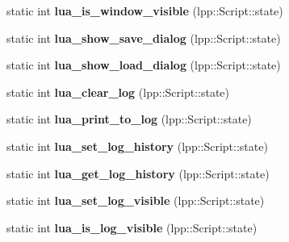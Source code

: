 \begin{DoxyCompactItemize}
\item 
static int {\bfseries lua\+\_\+is\+\_\+window\+\_\+visible} (lpp\+::\+Script\+::state)\hypertarget{class_lua_interface_a4317501b9787dac8b939cb7f7e69f614}{}\label{class_lua_interface_a4317501b9787dac8b939cb7f7e69f614}

\item 
static int {\bfseries lua\+\_\+show\+\_\+save\+\_\+dialog} (lpp\+::\+Script\+::state)\hypertarget{class_lua_interface_ad1b4e058570031254dd4723e580b5000}{}\label{class_lua_interface_ad1b4e058570031254dd4723e580b5000}

\item 
static int {\bfseries lua\+\_\+show\+\_\+load\+\_\+dialog} (lpp\+::\+Script\+::state)\hypertarget{class_lua_interface_a90d8da940b5131634578c415641025eb}{}\label{class_lua_interface_a90d8da940b5131634578c415641025eb}

\item 
static int {\bfseries lua\+\_\+clear\+\_\+log} (lpp\+::\+Script\+::state)\hypertarget{class_lua_interface_add5ca19699ca60b9bac9a83d91a36740}{}\label{class_lua_interface_add5ca19699ca60b9bac9a83d91a36740}

\item 
static int {\bfseries lua\+\_\+print\+\_\+to\+\_\+log} (lpp\+::\+Script\+::state)\hypertarget{class_lua_interface_a0c3a74e86ea961cdd7ddab5b56f562d3}{}\label{class_lua_interface_a0c3a74e86ea961cdd7ddab5b56f562d3}

\item 
static int {\bfseries lua\+\_\+set\+\_\+log\+\_\+history} (lpp\+::\+Script\+::state)\hypertarget{class_lua_interface_afbce58059a82b5a7822da586282d630b}{}\label{class_lua_interface_afbce58059a82b5a7822da586282d630b}

\item 
static int {\bfseries lua\+\_\+get\+\_\+log\+\_\+history} (lpp\+::\+Script\+::state)\hypertarget{class_lua_interface_a6d3e725b2559b70e7ad4a9c21dac0d1b}{}\label{class_lua_interface_a6d3e725b2559b70e7ad4a9c21dac0d1b}

\item 
static int {\bfseries lua\+\_\+set\+\_\+log\+\_\+visible} (lpp\+::\+Script\+::state)\hypertarget{class_lua_interface_add6a8ef9980e6088797569b67fe8a783}{}\label{class_lua_interface_add6a8ef9980e6088797569b67fe8a783}

\item 
static int {\bfseries lua\+\_\+is\+\_\+log\+\_\+visible} (lpp\+::\+Script\+::state)\hypertarget{class_lua_interface_aae598e398403b7129dd0effcbb37d6f9}{}\label{class_lua_interface_aae598e398403b7129dd0effcbb37d6f9}


\end{DoxyCompactItemize}
